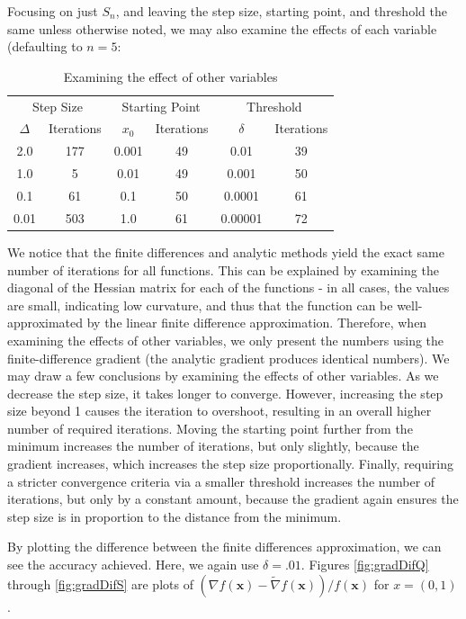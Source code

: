 \documentclass[11pt,letterpaper]{article}
\begin{document}
Focusing on just $S_n$, and leaving the step size, starting point, and threshold the same unless otherwise noted, we may also examine the effects of each variable (defaulting to $n=5$:

\begin{table}[h]
\centering
\caption{Examining the effect of other variables}
\begin{tabular}{cc|cc|cc}
\multicolumn{2}{c}{Step Size}& \multicolumn{2}{|c}{Starting Point} & \multicolumn{2}{|c}{Threshold} \\
$\Delta$  & Iterations        & $x_0$   & Iterations   & $\delta$  & Iterations     \\\hline
2.0       & 177               & 0.001   & 49           & 0.01      & 39     \\
1.0       & 5                 & 0.01    & 49           & 0.001     & 50     \\
0.1       & 61                & 0.1     & 50           & 0.0001    & 61     \\
0.01      & 503               & 1.0     & 61           & 0.00001   & 72  
\end{tabular}
\end{table}

We notice that the finite differences and analytic methods yield the exact same number of iterations for all functions. This can be explained by examining the diagonal of the Hessian matrix for each of the functions - in all cases, the values are small, indicating low curvature, and thus that the function can be well-approximated by the linear finite difference approximation. Therefore, when examining the effects of other variables, we only present the numbers using the finite-difference gradient (the analytic gradient produces identical numbers). We may draw a few conclusions by examining the effects of other variables. As we decrease the step size, it takes longer to converge. However, increasing the step size beyond 1 causes the iteration to overshoot, resulting in an overall higher number of required iterations. Moving the starting point further from the minimum increases the number of iterations, but only slightly, because the gradient increases, which increases the step size proportionally. Finally, requiring a stricter convergence criteria via a smaller threshold increases the number of iterations, but only by a constant amount, because the gradient again ensures the step size is in proportion to the distance from the minimum.

By plotting the difference between the finite differences approximation, we can see the accuracy achieved. Here, we again use $\delta = .01$. Figures \ref{fig:gradDifQ} through \ref{fig:gradDifS} are plots of $(\nabla f(\mathbf{x}) - \tilde{\nabla} f(\mathbf{x}))/f(\mathbf{x})$ for $x=(0,1)$.
\end{document}
